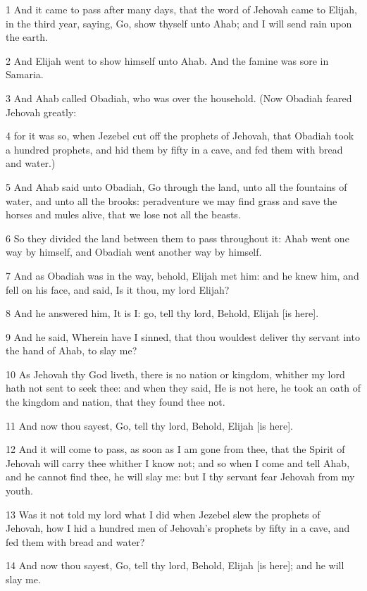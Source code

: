 \par 1 And it came to pass after many days, that the word of Jehovah came to Elijah, in the third year, saying, Go, show thyself unto Ahab; and I will send rain upon the earth.
\par 2 And Elijah went to show himself unto Ahab. And the famine was sore in Samaria.
\par 3 And Ahab called Obadiah, who was over the household. (Now Obadiah feared Jehovah greatly:
\par 4 for it was so, when Jezebel cut off the prophets of Jehovah, that Obadiah took a hundred prophets, and hid them by fifty in a cave, and fed them with bread and water.)
\par 5 And Ahab said unto Obadiah, Go through the land, unto all the fountains of water, and unto all the brooks: peradventure we may find grass and save the horses and mules alive, that we lose not all the beasts.
\par 6 So they divided the land between them to pass throughout it: Ahab went one way by himself, and Obadiah went another way by himself.
\par 7 And as Obadiah was in the way, behold, Elijah met him: and he knew him, and fell on his face, and said, Is it thou, my lord Elijah?
\par 8 And he answered him, It is I: go, tell thy lord, Behold, Elijah [is here].
\par 9 And he said, Wherein have I sinned, that thou wouldest deliver thy servant into the hand of Ahab, to slay me?
\par 10 As Jehovah thy God liveth, there is no nation or kingdom, whither my lord hath not sent to seek thee: and when they said, He is not here, he took an oath of the kingdom and nation, that they found thee not.
\par 11 And now thou sayest, Go, tell thy lord, Behold, Elijah [is here].
\par 12 And it will come to pass, as soon as I am gone from thee, that the Spirit of Jehovah will carry thee whither I know not; and so when I come and tell Ahab, and he cannot find thee, he will slay me: but I thy servant fear Jehovah from my youth.
\par 13 Was it not told my lord what I did when Jezebel slew the prophets of Jehovah, how I hid a hundred men of Jehovah's prophets by fifty in a cave, and fed them with bread and water?
\par 14 And now thou sayest, Go, tell thy lord, Behold, Elijah [is here]; and he will slay me.
